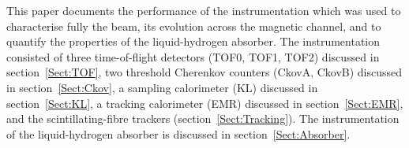 This paper documents the performance of the instrumentation which was
used to characterise fully the beam, its evolution across the magnetic
channel, and to quantify the properties of the liquid-hydrogen
absorber.
The instrumentation consisted of three time-of-flight detectors
(TOF0, TOF1, TOF2) discussed in section~\ref{Sect:TOF}, two 
threshold Cherenkov counters (CkovA, CkovB) discussed in
section~\ref{Sect:Ckov}, a sampling calorimeter (KL) discussed in
section~\ref{Sect:KL}, a tracking calorimeter (EMR) discussed in
section~\ref{Sect:EMR}, and the scintillating-fibre trackers
(section~\ref{Sect:Tracking}).
The instrumentation of the liquid-hydrogen absorber is discussed in
section~\ref{Sect:Absorber}.

